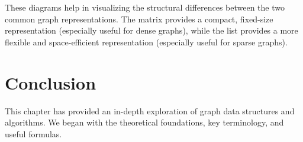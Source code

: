 These diagrams help in visualizing the structural differences between the two common graph representations. The matrix provides a compact, fixed-size representation (especially useful for dense graphs), while the list provides a more flexible and space-efficient representation (especially useful for sparse graphs).

\section{Conclusion}
This chapter has provided an in-depth exploration of graph data structures and algorithms. We began with the theoretical foundations, key terminology, and useful formulas.